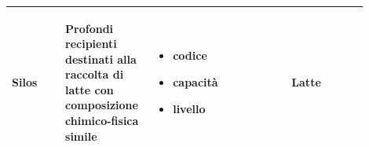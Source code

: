 \documentclass[12pt,a4paper]{article}
\begin{document}
\begin{center}
\begin{longtable}{|p{0.14\linewidth}|p{0.20\linewidth}|p{0.36\linewidth}|p{0.20\linewidth}|}
\hline
Silos				 	& \begin{flushleft}\vspace{-25pt} Profondi recipienti destinati alla raccolta di latte con composizione chimico-fisica simile \end{flushleft}
					& \begin{itemize}
						\setlength{\itemindent}{-1em}
						\vspace{-25pt}
						\setlength\itemsep{-0.25em}
						\item codice
						\item capacità
						\item livello
					\end{itemize}
					& \begin{flushleft}\vspace{-25pt} Latte \end{flushleft} \\ 

\hline

\end{longtable}
\end{center}
\pagebreak
\end{document}
